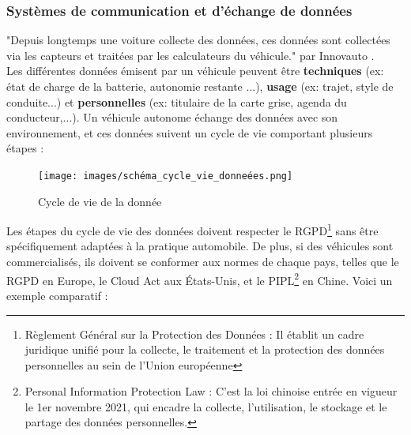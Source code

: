 \subsubsection{Systèmes de communication et d’échange de données}
"Depuis longtemps une voiture collecte des données, ces données sont collectées via les capteurs et traitées par les calculateurs du véhicule." par Innovauto \cite{donnees_echange}.\\
Les différentes données émisent par un véhicule peuvent être \textbf{techniques} (ex: état de charge de la batterie, autonomie restante ...), \textbf{usage} (ex: trajet, style de conduite...) et \textbf{personnelles} (ex: titulaire de la carte grise, agenda du conducteur,...).
Un véhicule autonome échange des données avec son environnement, et ces données suivent un cycle de vie comportant plusieurs étapes :
\begin{figure}[H]
    \centering
    \texttt{[image: images/schéma\_cycle\_vie\_donneées.png]} 
    \caption{Cycle de vie de la donnée}
\end{figure}
Les étapes du cycle de vie des données doivent respecter le RGPD\footnote{Règlement Général sur la Protection des Données : Il établit un cadre juridique unifié pour la collecte, le traitement et la protection des données personnelles au sein de l’Union européenne} sans être spécifiquement adaptées à la pratique automobile. De plus, si des véhicules sont commercialisés, ils doivent se conformer aux normes de chaque pays, telles que le RGPD en Europe, le Cloud Act aux États-Unis, et le PIPL\footnote{ Personal Information Protection Law : C’est la loi chinoise entrée en vigueur le 1er novembre 2021, qui encadre la collecte, l’utilisation, le stockage et le partage des données personnelles.} en Chine. Voici un exemple comparatif :
